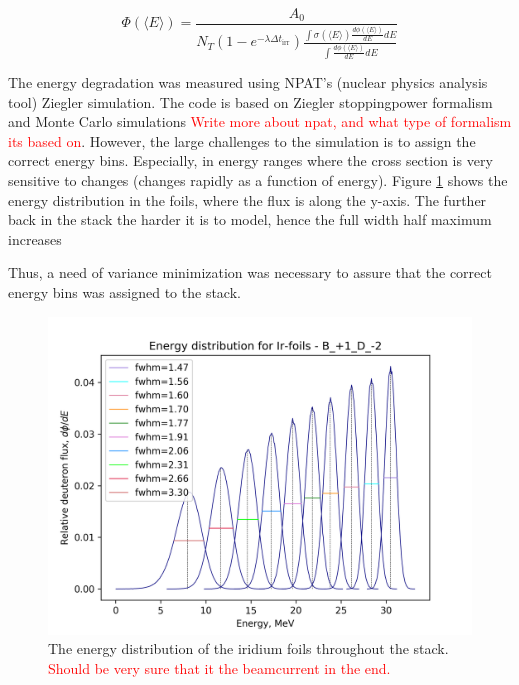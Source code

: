 \documentclass[a4paper,11pt,twoside]{book}
\begin{document}
\begin{equation}
    \Phi(\langle E \rangle) = \frac{A_0}{N_T (1-e^{-\lambda \Delta t_\text{irr}})\frac{\int \sigma(\langle E \rangle) \frac{d\phi(\langle E \rangle)}{dE}dE}{\int \frac{d\phi(\langle E \rangle)}{dE}dE}}
\end{equation}

\noindent 
The energy degradation was measured using NPAT's (nuclear physics analysis tool) Ziegler simulation. The code is based on Ziegler stoppingpower formalism and Monte Carlo simulations \textcolor{red}{Write more about npat, and what type of formalism its based on}. However, the large challenges to the simulation is to assign the correct energy bins. Especially, in energy ranges where the cross section is very sensitive to changes (changes rapidly as a function of energy). Figure \ref{fig:Ir_Flux_Distr} shows the energy distribution in the foils, where the flux is along the y-axis. The further back in the stack the harder it is to model, hence the full width half maximum increases

Thus, a need of variance minimization was necessary to assure that the correct energy bins was assigned to the stack. 

\begin{figure}
    \centering
    \includegraphics{Analysis/Ir_flux_distribution_B_+1_D_-2.png}
    \caption{The energy distribution of the iridium foils throughout the stack. \textcolor{red}{Should be very sure that it the beamcurrent in the end. } }
    \label{fig:Ir_Flux_Distr}
\end{figure}
\end{document}

